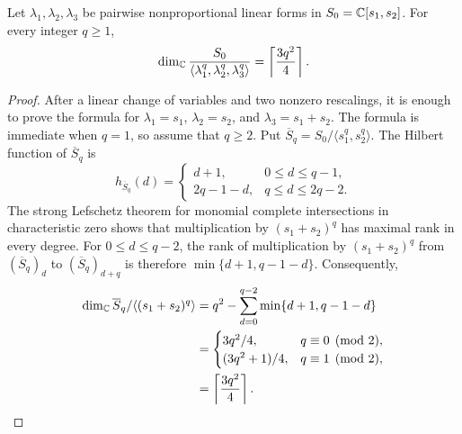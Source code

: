 \begin{lemma}
	\label{lem:three-linear-form-powers-length}
	Let \(\lambda_1,\lambda_2,\lambda_3\) be pairwise nonproportional linear forms in \(S_0=\mathbb C[s_1,s_2]\).
	For every integer \(q\geq1\),
	\begin{equation}
		\dim_{\mathbb C}
		\frac{S_0}{\langle\lambda_1^q,\lambda_2^q,\lambda_3^q\rangle}
		=
		\left\lceil\frac{3q^2}{4}\right\rceil.
		\label{eq:three-linear-form-powers-length}
	\end{equation}
\end{lemma}

\begin{proof}
	After a linear change of variables and two nonzero rescalings, it is enough to prove the formula for \(\lambda_1=s_1\), \(\lambda_2=s_2\), and \(\lambda_3=s_1+s_2\).
	The formula is immediate when \(q=1\), so assume that \(q\geq2\).
	Put \(\overline S_q=S_0/\langle s_1^q,s_2^q\rangle\).
	The Hilbert function of \(\overline S_q\) is
	\[
		h_{\overline S_q}(d)
		=
		\begin{cases}
			d+1,    & 0\leq d\leq q-1, \\
			2q-1-d, & q\leq d\leq2q-2.
		\end{cases}
	\]
	The strong Lefschetz theorem for monomial complete intersections in characteristic zero \cite[Theorem~5 and Proposition~9]{RRR91} shows that multiplication by \((s_1+s_2)^q\) has maximal rank in every degree.
	For \(0\leq d\leq q-2\), the rank of multiplication by \((s_1+s_2)^q\) from \((\overline S_q)_d\) to \((\overline S_q)_{d+q}\) is therefore \(\min\{d+1,q-1-d\}\).
	Consequently,
	\begin{align*}
		\dim_{\mathbb C}\overline S_q/\langle(s_1+s_2)^q\rangle
		 & =q^2-
		\sum_{d=0}^{q-2}\min\{d+1,q-1-d\}          \\
		 & =
		\begin{cases}
			3q^2/4,     & q\equiv0\pmod2, \\
			(3q^2+1)/4, & q\equiv1\pmod2,
		\end{cases}                       \\
		 & =\left\lceil\frac{3q^2}{4}\right\rceil.
	\end{align*}
\end{proof}
